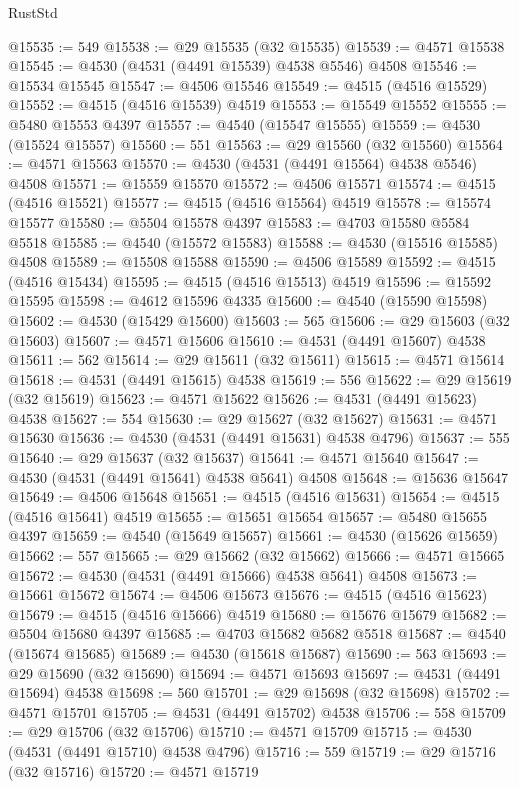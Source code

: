 \begin{lexlean}{RustStd}
\begin{coremodule}
@15535 := 549
@15538 := @29 @15535 (@32 @15535)
@15539 := @4571 @15538
@15545 := @4530 (@4531 (@4491 @15539) @4538 @5546) @4508
@15546 := @15534 @15545
@15547 := @4506 @15546
@15549 := @4515 (@4516 @15529)
@15552 := @4515 (@4516 @15539) @4519
@15553 := @15549 @15552
@15555 := @5480 @15553 @4397
@15557 := @4540 (@15547 @15555)
@15559 := @4530 (@15524 @15557)
@15560 := 551
@15563 := @29 @15560 (@32 @15560)
@15564 := @4571 @15563
@15570 := @4530 (@4531 (@4491 @15564) @4538 @5546) @4508
@15571 := @15559 @15570
@15572 := @4506 @15571
@15574 := @4515 (@4516 @15521)
@15577 := @4515 (@4516 @15564) @4519
@15578 := @15574 @15577
@15580 := @5504 @15578 @4397
@15583 := @4703 @15580 @5584 @5518
@15585 := @4540 (@15572 @15583)
@15588 := @4530 (@15516 @15585) @4508
@15589 := @15508 @15588
@15590 := @4506 @15589
@15592 := @4515 (@4516 @15434)
@15595 := @4515 (@4516 @15513) @4519
@15596 := @15592 @15595
@15598 := @4612 @15596 @4335
@15600 := @4540 (@15590 @15598)
@15602 := @4530 (@15429 @15600)
@15603 := 565
@15606 := @29 @15603 (@32 @15603)
@15607 := @4571 @15606
@15610 := @4531 (@4491 @15607) @4538
@15611 := 562
@15614 := @29 @15611 (@32 @15611)
@15615 := @4571 @15614
@15618 := @4531 (@4491 @15615) @4538
@15619 := 556
@15622 := @29 @15619 (@32 @15619)
@15623 := @4571 @15622
@15626 := @4531 (@4491 @15623) @4538
@15627 := 554
@15630 := @29 @15627 (@32 @15627)
@15631 := @4571 @15630
@15636 := @4530 (@4531 (@4491 @15631) @4538 @4796)
@15637 := 555
@15640 := @29 @15637 (@32 @15637)
@15641 := @4571 @15640
@15647 := @4530 (@4531 (@4491 @15641) @4538 @5641) @4508
@15648 := @15636 @15647
@15649 := @4506 @15648
@15651 := @4515 (@4516 @15631)
@15654 := @4515 (@4516 @15641) @4519
@15655 := @15651 @15654
@15657 := @5480 @15655 @4397
@15659 := @4540 (@15649 @15657)
@15661 := @4530 (@15626 @15659)
@15662 := 557
@15665 := @29 @15662 (@32 @15662)
@15666 := @4571 @15665
@15672 := @4530 (@4531 (@4491 @15666) @4538 @5641) @4508
@15673 := @15661 @15672
@15674 := @4506 @15673
@15676 := @4515 (@4516 @15623)
@15679 := @4515 (@4516 @15666) @4519
@15680 := @15676 @15679
@15682 := @5504 @15680 @4397
@15685 := @4703 @15682 @5682 @5518
@15687 := @4540 (@15674 @15685)
@15689 := @4530 (@15618 @15687)
@15690 := 563
@15693 := @29 @15690 (@32 @15690)
@15694 := @4571 @15693
@15697 := @4531 (@4491 @15694) @4538
@15698 := 560
@15701 := @29 @15698 (@32 @15698)
@15702 := @4571 @15701
@15705 := @4531 (@4491 @15702) @4538
@15706 := 558
@15709 := @29 @15706 (@32 @15706)
@15710 := @4571 @15709
@15715 := @4530 (@4531 (@4491 @15710) @4538 @4796)
@15716 := 559
@15719 := @29 @15716 (@32 @15716)
@15720 := @4571 @15719

\end{coremodule}
\end{lexlean}
